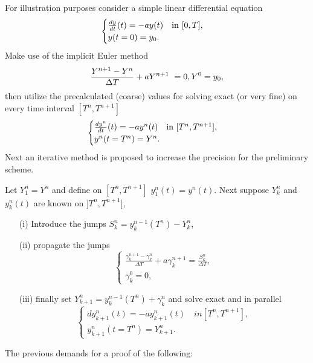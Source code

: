 For illustration purposes consider a simple linear differential equation 
\begin{equation}
\begin{cases}
\frac{dy}{dt}(t) = -ay(t) \quad \textnormal{in}\ [0, T], \\
y(t=0) = y_0.
\end{cases}
\end{equation}
Make use of the implicit Euler method
\begin{equation}
\frac{Y^{n+1} - Y^{n}}{\Delta T} + aY^{n+1} = 0, \\
Y^0 = y_0,
\end{equation}
then utilize the precalculated (coarse) values for 
solving exact (or very fine) on every time interval $[T^n, T^{n+1}]$ 
\begin{equation}
\begin{cases}
\frac{dy^n}{dt}(t) = -ay^n(t)\quad \textnormal{in}\ [T^n, T^{n+1}], \\
y^n(t=T^n) = Y^n.
\end{cases}
\end{equation}
Next an iterative method is proposed to increase 
the precision for the preliminary scheme.

Let $Y_1^n = Y^n$ and define on $[T^n, T^{n+1}]$ $y_1^n(t) = y^n(t)$. Next
suppose $Y_k^n$ and $y_k^n(t)$ are known on $]T^n, T^{n+1}]$,
\begin{enumerate}
\item[(i)] Introduce the jumps $S_k^n = y_k^{n-1}(T^n)-Y_k^n$,
\item[(ii)] propagate the jumps
\begin{equation}
\label{eq:propagation_of_jumps}
\begin{cases}
\frac{\gamma_k^{n+1} - \gamma_k^n}{\Delta T} + a \gamma_k^{n+1} = \frac{S_k^n}{\Delta T},\\
\gamma_k^0 = 0,
\end{cases}
\end{equation}
\item[(iii)] finally set $Y_{k+1}^n = y_k^{n-1}(T^n) + \gamma_k^n$ and solve exact and in parallel
\begin{equation}
\begin{cases}
dy_{k+1}^n(t) = -ay_{k+1}^n(t) \quad in [T^n, T^{n+1}], \\
y_{k+1}^n(t = T^n) = Y_{k+1}^n.
\end{cases}
\end{equation}
\end{enumerate}
The previous demands for a proof of the following:
